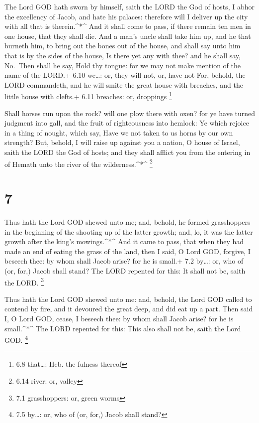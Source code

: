  The Lord GOD hath sworn by himself, saith the LORD the God
of hosts, I abhor the excellency of Jacob, and hate his palaces:
therefore will I deliver up the city with all that is therein.\^{}*\^{}
 And it shall come to pass, if there remain ten men in one
house, that they shall die.  And a man's uncle shall take
him up, and he that burneth him, to bring out the bones out of the
house, and shall say unto him that is by the sides of the house, Is
there yet any with thee? and he shall say, No.~Then shall he say, Hold
thy tongue: for we may not make mention of the name of the LORD.+ 6.10
we\ldots: or, they will not, or, have not  For, behold, the
LORD commandeth, and he will smite the great house with breaches, and
the little house with clefts.+ 6.11 breaches: or, droppings \footnote{6.8
  that\ldots: Heb. the fulness thereof}

 Shall horses run upon the rock? will one plow there with
oxen? for ye have turned judgment into gall, and the fruit of
righteousness into hemlock:  Ye which rejoice in a thing of
nought, which say, Have we not taken to us horns by our own strength?
 But, behold, I will raise up against you a nation, O house
of Israel, saith the LORD the God of hosts; and they shall afflict you
from the entering in of Hemath unto the river of the
wilderness.\^{}*\^{} \footnote{6.14 river: or, valley}

\hypertarget{section-6}{%
\section{7}\label{section-6}}

 Thus hath the Lord GOD shewed unto me; and, behold, he
formed grasshoppers in the beginning of the shooting up of the latter
growth; and, lo, it was the latter growth after the king's
mowings.\^{}*\^{}  And it came to pass, that when they had
made an end of eating the grass of the land, then I said, O Lord GOD,
forgive, I beseech thee: by whom shall Jacob arise? for he is small.+
7.2 by\ldots: or, who of (or, for,) Jacob shall stand?  The
LORD repented for this: It shall not be, saith the LORD. \footnote{7.1
  grasshoppers: or, green worms}

 Thus hath the Lord GOD shewed unto me: and, behold, the
Lord GOD called to contend by fire, and it devoured the great deep, and
did eat up a part.  Then said I, O Lord GOD, cease, I
beseech thee: by whom shall Jacob arise? for he is small.\^{}*\^{}
 The LORD repented for this: This also shall not be, saith
the Lord GOD. \footnote{7.5 by\ldots: or, who of (or, for,) Jacob shall
  stand?}

